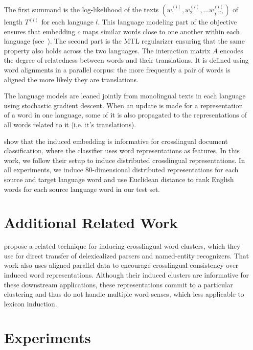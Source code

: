\documentclass[11pt]{article}
\begin{document}
The first summand is the log-likelihood of the texts $(w_1^{(l)}, w_2^{(l)}, \dots w_{T^{(l)}}^{(l)})$ of length $T^{(l)}$ for each language $l$.  This language modeling part of the objective ensures that embedding $c$ maps similar words close to one another within each language (see~).  The second part is the MTL regularizer ensuring that the same property also holds across the two languages.  
The interaction matrix $A$ encodes the degree of relatedness between words and their translations.   
It is defined using word alignments in a parallel corpus: the more frequently a pair of words is aligned the more likely they are translations.

The language models are leaned jointly from monolingual texts in each language using stochastic gradient descent.  When an update is made for a representation of a word in one language, some of it is also propagated to the representations of all words related to it (i.e. it's translations).

 show that the induced embedding is informative for crosslingual document classification, where the classifier uses word representations as features.
In this work, we follow their setup to induce distributed crosslingual representations. %
In all experiments, we induce 80-dimensional distributed representations for each source and target language word and use Euclidean distance to rank English words for each source language word in our test set.


\section{Additional Related Work} \label{sect:rework}

 propose a related technique for inducing crosslingual word clusters, which they use for direct transfer of delexicalized parsers and named-entity recognizers. 
That work also uses aligned parallel data to encourage crosslingual consistency over induced word representations.
Although their induced clusters are informative for these downstream applications, these representations commit to a particular clustering and thus do not handle multiple word senses, which less applicable to lexicon induction.

\section{Experiments} \label{sect:experiments}
\end{document}
